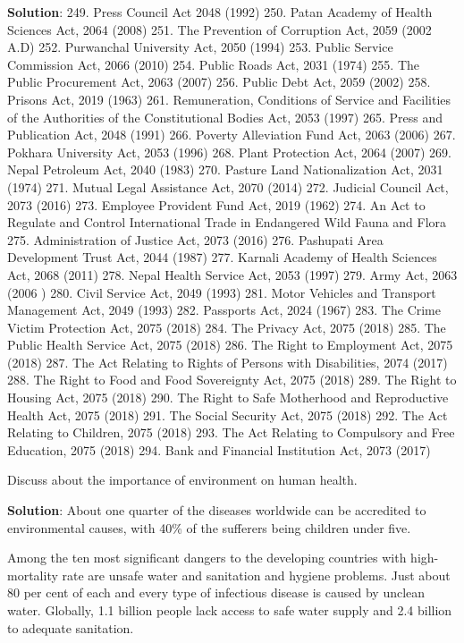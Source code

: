 \documentclass[
]{book}
\newcommand{\question}{\item}
\newenvironment{solution}{ {\bfseries Solution}:}{}
\begin{document}
\begin{questions}
\begin{solution}
249. Press Council Act 2048 (1992) 
250. Patan Academy of Health Sciences Act, 2064 (2008)
251. The Prevention of Corruption Act, 2059 (2002 A.D)
252. Purwanchal University Act, 2050 (1994)
253. Public Service Commission Act, 2066 (2010)
254. Public Roads Act, 2031 (1974)
255. The Public Procurement Act, 2063 (2007)
256. Public Debt Act, 2059 (2002)
258. Prisons Act, 2019 (1963)
261. Remuneration, Conditions of Service and Facilities of the Authorities of the Constitutional Bodies Act, 2053 (1997)
265. Press and Publication Act, 2048 (1991)
266. Poverty Alleviation Fund Act, 2063 (2006)
267. Pokhara University Act, 2053 (1996)
268. Plant Protection Act, 2064 (2007)
269. Nepal Petroleum Act, 2040 (1983)
270. Pasture Land Nationalization Act, 2031 (1974)
271. Mutual Legal Assistance Act, 2070 (2014)
272. Judicial Council Act, 2073 (2016)
273. Employee Provident Fund Act, 2019 (1962)
274. An Act to Regulate and Control International Trade in Endangered Wild Fauna and Flora
275. Administration of Justice Act, 2073 (2016)
276. Pashupati Area Development Trust Act, 2044 (1987)
277. Karnali Academy of Health Sciences Act, 2068 (2011)
278. Nepal Health Service Act, 2053 (1997)
279. Army Act, 2063 (2006 )
280. Civil Service Act, 2049 (1993)
281. Motor Vehicles and Transport Management Act, 2049 (1993)
282. Passports Act, 2024 (1967)
283. The Crime Victim Protection Act, 2075 (2018)
284. The Privacy Act, 2075 (2018)
285. The Public Health Service Act, 2075 (2018)
286. The Right to Employment Act, 2075 (2018)
287. The Act Relating to Rights of Persons with Disabilities, 2074 (2017)
288. The Right to Food and Food Sovereignty Act, 2075 (2018)
289. The Right to Housing Act, 2075 (2018)
290. The Right to Safe Motherhood and Reproductive Health Act, 2075 (2018)
291. The Social Security Act, 2075 (2018)
292. The Act Relating to Children, 2075 (2018)
293. The Act Relating to Compulsory and Free Education, 2075 (2018)
294. Bank and Financial Institution Act, 2073 (2017)
\end{solution}

\question Discuss about the importance of environment on human health.

\begin{solution}
About one quarter of the diseases worldwide can be accredited to environmental causes, with 40\% of the sufferers being children under five.

Among the ten most significant dangers to the developing countries with high-mortality rate are unsafe water and sanitation and hygiene problems. Just about 80 per cent of each and every type of infectious disease is caused by unclean water. Globally, 1.1 billion people lack access to safe water supply and 2.4 billion to adequate sanitation.


\end{solution}
\end{questions}
\end{document}
